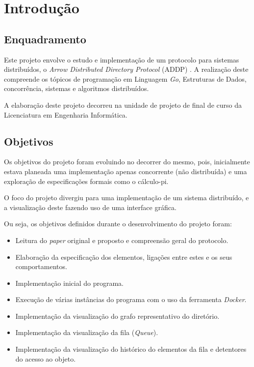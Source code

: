 \chapter{Introdução}
\label{chap:introducao}
\section{Enquadramento}
\label{introducao:sec:enquadramento}



Este projeto envolve o estudo e implementação de um protocolo para sistemas distribuídos, o \textit{Arrow Distributed Directory Protocol} (ADDP) \cite{Arrow}. 
A realização deste compreende os tópicos de programação em Linguagem \emph{Go}, Estruturas de Dados, concorrência, sistemas e algoritmos distribuídos.

A elaboração deste projeto decorreu na unidade de projeto de final de curso da Licenciatura em Engenharia Informática.



\section{Objetivos}
\label{introducao:sec:objetivos}


Os objetivos do projeto foram evoluindo no decorrer do mesmo, pois, inicialmente estava planeada uma implementação apenas concorrente (não distribuída) 
e uma exploração de especificações formais como o cálculo-pi. 

O foco do projeto divergiu para uma implementação de um sistema distribuído,
e a visualização deste fazendo uso de uma interface gráfica.

Ou seja, os objetivos definidos durante o desenvolvimento do projeto foram:

\begin{itemize}
    \item Leitura do \emph{paper} original e proposto e compreensão geral do protocolo.
    \item Elaboração da especificação dos elementos, ligações entre estes e os seus comportamentos.
    \item Implementação inicial do programa.
    \item Execução de várias instâncias do programa com o uso da ferramenta \emph{Docker}.
    \item Implementação da visualização do grafo representativo do diretório.
    \item Implementação da visualização da fila (\emph{Queue}).
    \item Implementação da visualização do histórico do elementos da fila e detentores do acesso ao objeto.

\end{itemize}

